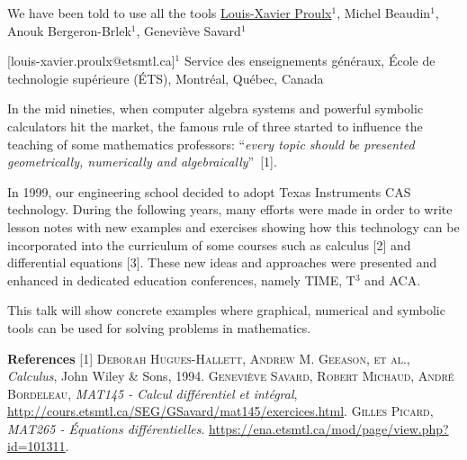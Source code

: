 


\begin{abstract_online}{We have been told to use all the tools}{%
        \underline{Louis-Xavier Proulx}$^{1}$, Michel Beaudin$^{1}$, Anouk Bergeron-Brlek$^{1}$, Genevi\`eve Savard$^{1}$}
    
    {[louis-xavier.proulx@etsmtl.ca]}{$^1$  Service des enseignements g\'en\'eraux, \'Ecole de technologie sup\'erieure (\'ETS), Montr\'eal, Qu\'ebec, Canada}
    
In the mid nineties, when computer algebra systems and powerful symbolic calculators hit the market, the famous rule of three started to influence the teaching of some mathematics professors: ``\emph{every topic should be presented geometrically, numerically and algebraically}''~[1].  

In 1999, our engineering school decided to adopt Texas Instruments CAS technology.  During the following years,  many efforts were made in order to write lesson notes with new examples and exercises showing how this technology can be incorporated into the curriculum of some courses such as calculus [2] and differential equations [3]. These new ideas and approaches were presented and enhanced in dedicated education conferences, namely TIME, T$^{3}$ and ACA.

This talk will show concrete examples where graphical, numerical and symbolic tools can be used for solving problems in mathematics.

\textbf{References} \newline{}
[1] \textsc{Deborah Hugues-Hallett, Andrew M. Geeason, et al.}, \emph{Calculus},  John Wiley \& Sons, 1994. \newline
[2] \textsc{Geneviève Savard, Robert Michaud, Andr\'e Bordeleau}, \emph{MAT145 - Calcul diff\'erentiel et int\'egral},  \small{\url{http://cours.etsmtl.ca/SEG/GSavard/mat145/exercices.html}}. \newline
[3] \textsc{Gilles Picard}, \emph{MAT265 - \'Equations diff\'erentielles}.  \small{\url{https://ena.etsmtl.ca/mod/page/view.php?id=101311}}. \newline

\end{abstract_online}
    